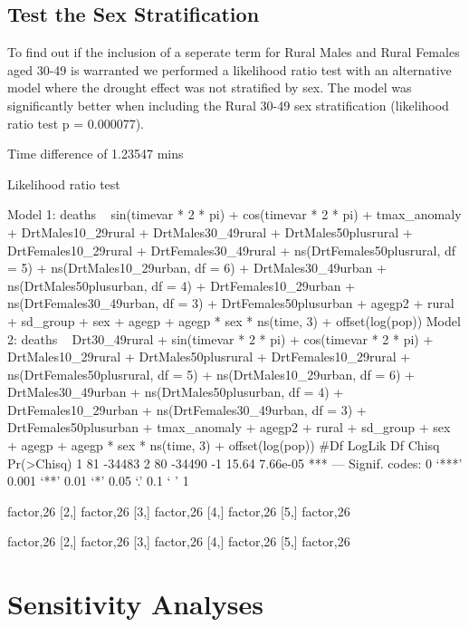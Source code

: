 \documentclass[a4paper]{article}                %
\begin{document}
\subsection{Test the Sex Stratification}
To find out if the inclusion of a seperate term for Rural Males and Rural Females aged 30-49 is warranted we performed a likelihood ratio test with an alternative model where the drought effect was not stratified by sex. The model was significantly better when including the Rural 30-49 sex stratification (likelihood ratio test p = 0.000077).
\begin{Schunk}
\begin{Soutput}
Time difference of 1.23547 mins
\end{Soutput}
\begin{Soutput}
Likelihood ratio test

Model 1: deaths ~ sin(timevar * 2 * pi) + cos(timevar * 2 * pi) + tmax_anomaly + 
    DrtMales10_29rural + DrtMales30_49rural + DrtMales50plusrural + 
    DrtFemales10_29rural + DrtFemales30_49rural + ns(DrtFemales50plusrural, 
    df = 5) + ns(DrtMales10_29urban, df = 6) + DrtMales30_49urban + 
    ns(DrtMales50plusurban, df = 4) + DrtFemales10_29urban + 
    ns(DrtFemales30_49urban, df = 3) + DrtFemales50plusurban + 
    agegp2 + rural + sd_group + sex + agegp + agegp * sex * ns(time, 
    3) + offset(log(pop))
Model 2: deaths ~ Drt30_49rural + sin(timevar * 2 * pi) + cos(timevar * 
    2 * pi) + DrtMales10_29rural + DrtMales50plusrural + DrtFemales10_29rural + 
    ns(DrtFemales50plusrural, df = 5) + ns(DrtMales10_29urban, 
    df = 6) + DrtMales30_49urban + ns(DrtMales50plusurban, df = 4) + 
    DrtFemales10_29urban + ns(DrtFemales30_49urban, df = 3) + 
    DrtFemales50plusurban + tmax_anomaly + agegp2 + rural + sd_group + 
    sex + agegp + agegp * sex * ns(time, 3) + offset(log(pop))
  #Df LogLik Df Chisq Pr(>Chisq)    
1  81 -34483                        
2  80 -34490 -1 15.64   7.66e-05 ***
---
Signif. codes:  0 ‘***’ 0.001 ‘**’ 0.01 ‘*’ 0.05 ‘.’ 0.1 ‘ ’ 1
\end{Soutput}
\begin{Soutput}
     [,1]     
[1,] factor,26
[2,] factor,26
[3,] factor,26
[4,] factor,26
[5,] factor,26
\end{Soutput}
\begin{Soutput}
     [,1]     
[1,] factor,26
[2,] factor,26
[3,] factor,26
[4,] factor,26
[5,] factor,26
\end{Soutput}
\end{Schunk}

\section{Sensitivity Analyses}
\end{document}
